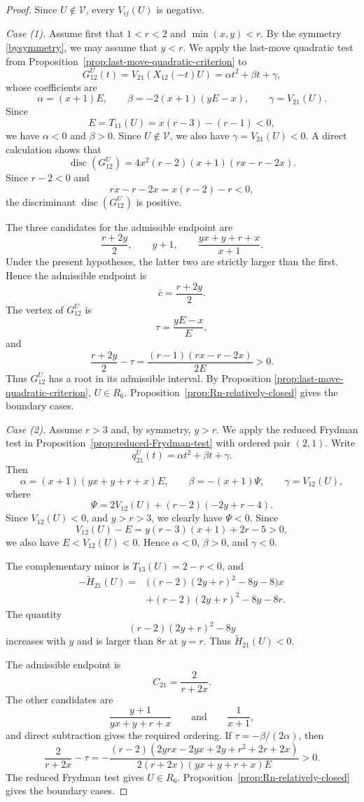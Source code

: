 \documentclass[11pt,onecolumn]{amsart}
\theoremstyle{plain}
\theoremstyle{definition}
\theoremstyle{remark}
\newcommand{\V}{\mathcal V}
\newcommand{\disc}{\operatorname{disc}}
\begin{document}
\begin{proof}
Since $U\notin\V$, every $V_{ij}(U)$ is negative.

\smallskip
\noindent
\emph{Case (1).}
Assume first that $1<r<2$ and $\min(x,y)<r$. By the symmetry \eqref{bysymmetry}, we may assume that $y<r$. We apply the
last-move quadratic test from
Proposition~\ref{prop:last-move-quadratic-criterion} to
\[
G_{12}^U(t)=V_{21}(X_{12}(-t)U)=\alpha t^2+\beta t+\gamma,
\]
whose coefficients are
\[
\alpha=(x+1)E,
\qquad
\beta=-2(x+1)(yE-x),
\qquad
\gamma=V_{21}(U).
\]
Since 
\[
E=T_{11}(U)=x(r-3)-(r-1)<0,
\]
we have  $\alpha<0$ and $\beta>0$. Since $U\notin \V$, we also have $\gamma=V_{21}(U)<0$.
A direct calculation shows that
\[
\disc(G_{12}^U)
=4x^2(r-2)(x+1)(rx-r-2x).
\]
Since $r-2<0$ and
\[
rx-r-2x=x(r-2)-r<0,
\]
the discriminant $\disc(G_{12}^U)$ is positive.

The three candidates for the admissible endpoint are
\[
\frac{r+2y}{2},
\qquad
y+1,
\qquad
\frac{yx+y+r+x}{x+1}.
\]
Under the present hypotheses, the latter two are strictly larger than the first.
Hence the admissible endpoint is
\[
\bar c=\frac{r+2y}{2}.
\]
The vertex of $G_{12}^U$ is
\[
\tau=\frac{yE-x}{E},
\]
and
\[
\frac{r+2y}{2}-\tau
=\frac{(r-1)(rx-r-2x)}{2E}>0.
\]
Thus $G_{12}^U$ has a root in its admissible interval. By Proposition \ref{prop:last-move-quadratic-criterion}, $U\in R_6$. Proposition~\ref{prop:Rn-relatively-closed} gives the
boundary cases.


\smallskip
\noindent
\emph{Case (2).}
Assume $r>3$ and, by symmetry, $y>r$. We apply the reduced Frydman test
in Proposition~\ref{prop:reduced-Frydman-test} with ordered pair
$(2,1)$. Write
\[
q_{21}^U(t)=\alpha t^2+\beta t+\gamma.
\]
Then
\[
\alpha=(x+1)(yx+y+r+x)E,
\qquad
\beta=-(x+1)\Psi,
\qquad
\gamma=V_{12}(U),
\]
where
\[
\Psi=2V_{12}(U)+(r-2)(-2y+r-4).
\]
Since $V_{12}(U)<0$, and $y>r>3$, we clearly have $\Psi<0$.
Since
\[
V_{12}(U)-E=y(r-3)(x+1)+2r-5>0,
\]
we also have $E<V_{12}(U)<0$. Hence $\alpha<0$, $\beta>0$, and $\gamma<0$.

The complementary minor is $T_{13}(U)=2-r<0$, and
\[
\begin{aligned}
-\widetilde H_{21}(U)={}&\bigl((r-2)(2y+r)^2-8y-8\bigr)x\\
&+(r-2)(2y+r)^2-8y-8r.
\end{aligned}
\]
The quantity
\[
(r-2)(2y+r)^2-8y
\]
increases with $y$ and is larger than
$8r$ at $y=r$.  Thus $\widetilde H_{21}(U)<0$.

The admissible endpoint is
\[
C_{21}=\frac{2}{r+2x}.
\]
The other candidates are
\[
\frac{y+1}{yx+y+r+x}
\qquad\text{and}\qquad
\frac{1}{x+1},
\]
and direct subtraction gives the required ordering. If
$\tau=-\beta/(2\alpha)$, then
\[
\frac2{r+2x}-\tau
=-\frac{(r-2)(2yrx-2yx+2y+r^2+2r+2x)}
{2(r+2x)(yx+y+r+x)E}>0.
\]
The reduced Frydman test gives $U\in R_6$.
Proposition~\ref{prop:Rn-relatively-closed} gives the boundary cases.


\end{proof}
\end{document}
